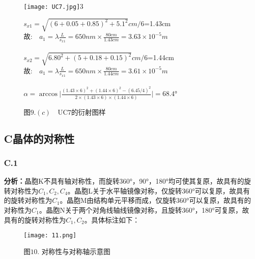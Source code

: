 \documentclass{ctexart}
\begin{document}
\begin{figure}[H]
  \begin{minipage}[c]{0.45\linewidth}
    \texttt{[image: UC7.jpg]}3

    \caption*{图$9.(c)\quad \mathrm{UC7}$的衍射图样}
    \end{minipage}
    \hspace{1cm}
    \begin{minipage}[c]{0.8\linewidth}
    $s_{x1}=\sqrt{(6+0.05+0.85)^2+5.1^2}cm/6$=1.43cm\\
    故:$\quad a_1=\lambda\frac{L}{s_{x1}}=650nm\times \frac{80cm}{1.43cm}=3.63\times 10^{-5}m$\\
    \noindent \\
    $s_{x2}=\sqrt{6.80^2+(5+0.18+0.15)^2}cm/6$=1.44cm\\
    故:$\quad a_1=\lambda\frac{L}{s_{x1}}=650nm\times \frac{80cm}{1.44cm}=3.61\times 10^{-5}m$\\
    \noindent \\
    $\alpha=\arccos\Big|\frac{(1.43\times 6)^2+(1.44\times 6)^2-(6.45/4)^2}{2\times (1.43\times 6) \times (1.44 \times 6) }\Big|=68.4°$
    \end{minipage}
\end{figure}
\subsection*{C\quad 晶体的对称性}
\subsubsection*{C.1}
\noindent \textbf{分析：}晶胞K不具有轴对称性，而旋转360°，90°，180°均可使其复原，故具有的旋转对称性为$C_1,C_2,C_4$。晶胞L关于水平轴镜像对称，仅旋转360°可以复原，故具有的旋转对称性为$C_1$。晶胞M由结构单元平移而成，仅旋转360°可以复原，故具有的对称性为$C_1$。晶胞N关于两个对角线轴线镜像对称，且旋转360°，180°可复原，故具有的旋转对称性为$C_1,C_2$。具体标注如下：\\
\begin{figure}[H]
  \centering
  \texttt{[image: 11.png]}
  \caption*{图$10.$ 对称性与对称轴示意图}
\end{figure}
\clearpage
\end{document}
